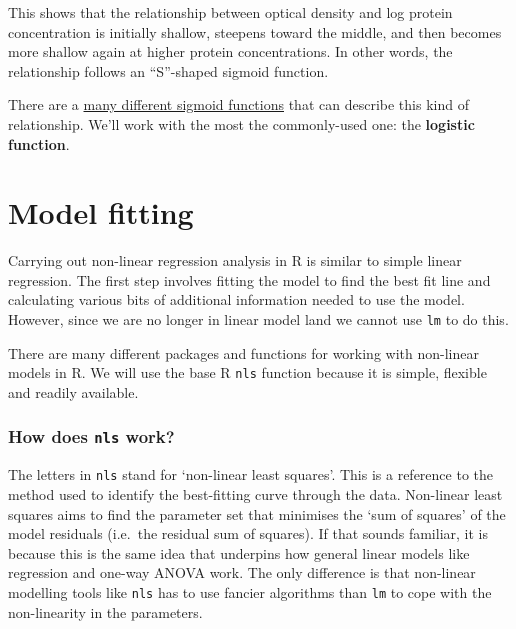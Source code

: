 \documentclass[
]{book}
\newenvironment{greybox}{
  \definecolor{shadecolor}{rgb}{0.95,0.95,0.95}  %
  \color{black}
  \begin{shaded}}
 {\end{shaded}}
\newenvironment{infobox}[1]
  {
  \begin{itemize}
  \renewcommand{\labelitemi}{
    \raisebox{-.7\height}[0pt][0pt]{
      {\setkeys{Gin}{width=3em,keepaspectratio}
        \texttt{[image: images/\#1]}}
    }
  }
  \setlength{\fboxsep}{1em}
  \begin{greybox}
  \item
  }
  {
  \end{greybox}
  \end{itemize}
  }
\begin{document}
This shows that the relationship between optical density and log protein concentration is initially shallow, steepens toward the middle, and then becomes more shallow again at higher protein concentrations. In other words, the relationship follows an ``S''-shaped sigmoid function.

There are a \href{https://en.wikipedia.org/wiki/Sigmoid_function}{many different sigmoid functions} that can describe this kind of relationship. We'll work with the most the commonly-used one: the \textbf{logistic function}.

\hypertarget{model-fitting}{%
\section{Model fitting}\label{model-fitting}}

Carrying out non-linear regression analysis in R is similar to simple linear regression. The first step involves fitting the model to find the best fit line and calculating various bits of additional information needed to use the model. However, since we are no longer in linear model land we cannot use \texttt{lm} to do this.

There are many different packages and functions for working with non-linear models in R. We will use the base R \texttt{nls} function because it is simple, flexible and readily available.

\begin{infobox}{information}

\hypertarget{how-does-nls-work}{%
\subsubsection*{\texorpdfstring{How does \texttt{nls} work?}{How does nls work?}}\label{how-does-nls-work}}

The letters in \texttt{nls} stand for `non-linear least squares'. This is a reference to the method used to identify the best-fitting curve through the data. Non-linear least squares aims to find the parameter set that minimises the `sum of squares' of the model residuals (i.e.~the residual sum of squares). If that sounds familiar, it is because this is the same idea that underpins how general linear models like regression and one-way ANOVA work. The only difference is that non-linear modelling tools like \texttt{nls} has to use fancier algorithms than \texttt{lm} to cope with the non-linearity in the parameters.

\end{infobox}
\end{document}
